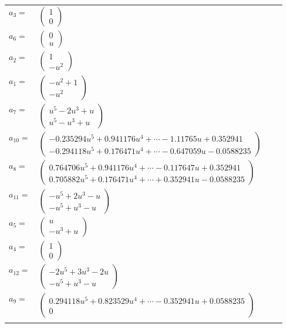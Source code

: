 \documentclass[1p]{elsarticle_modified}
\theoremstyle{definition}
\begin{document}
\begin{tabular}{m{7pt} m{180pt} m{7pt} m{180pt} }
\flushright $a_{3}=$&$\begin{pmatrix}1\\0\end{pmatrix}$ \\
\flushright $a_{6}=$&$\begin{pmatrix}0\\u\end{pmatrix}$ \\
\flushright $a_{2}=$&$\begin{pmatrix}1\\- u^2\end{pmatrix}$ \\
\flushright $a_{1}=$&$\begin{pmatrix}- u^2+1\\- u^2\end{pmatrix}$ \\
\flushright $a_{7}=$&$\begin{pmatrix}u^5-2 u^3+u\\u^5- u^3+u\end{pmatrix}$ \\
\flushright $a_{10}=$&$\begin{pmatrix}-0.235294 u^{5}+0.941176 u^{4}+\cdots-1.11765 u+0.352941\\-0.294118 u^{5}+0.176471 u^{4}+\cdots-0.647059 u-0.0588235\end{pmatrix}$ \\
\flushright $a_{8}=$&$\begin{pmatrix}0.764706 u^{5}+0.941176 u^{4}+\cdots-0.117647 u+0.352941\\0.705882 u^{5}+0.176471 u^{4}+\cdots+0.352941 u-0.0588235\end{pmatrix}$ \\
\flushright $a_{11}=$&$\begin{pmatrix}- u^5+2 u^3- u\\- u^5+u^3- u\end{pmatrix}$ \\
\flushright $a_{5}=$&$\begin{pmatrix}u\\- u^3+u\end{pmatrix}$ \\
\flushright $a_{4}=$&$\begin{pmatrix}1\\0\end{pmatrix}$ \\
\flushright $a_{12}=$&$\begin{pmatrix}-2 u^5+3 u^3-2 u\\- u^5+u^3- u\end{pmatrix}$ \\
\flushright $a_{9}=$&$\begin{pmatrix}0.294118 u^{5}+0.823529 u^{4}+\cdots-0.352941 u+0.0588235\\0\end{pmatrix}$\\&\end{tabular}
\end{document}
